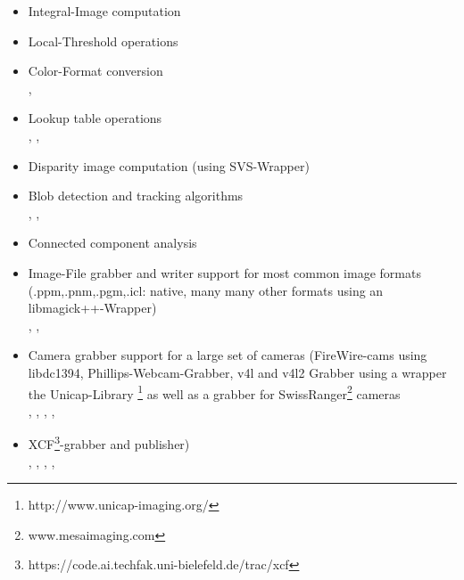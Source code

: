 \begin{itemize}
\item Integral-Image computation\\

\item Local-Threshold operations\\

\item Color-Format conversion\\
, 

\item Lookup table operations\\
, , 

\item Disparity image computation (using SVS-Wrapper)\\

\item Blob detection and tracking algorithms\\
, , 

\item Connected component analysis\\

\item Image-File grabber and writer support for most common image formats (.ppm,.pnm,.pgm,.icl: native, many many other formats using an libmagick++-Wrapper)\\
, , 

\item Camera grabber support for a large set of cameras (FireWire-cams using libdc1394, Phillips-Webcam-Grabber, v4l and v4l2 Grabber using a wrapper the Unicap-Library \footnote{http://www.unicap-imaging.org/} as well as a grabber for SwissRanger\footnote{www.mesaimaging.com} cameras\\
, , , , 

\item XCF\footnote{https://code.ai.techfak.uni-bielefeld.de/trac/xcf}-grabber and publisher)\\
, , ,
,    


\end{itemize}
